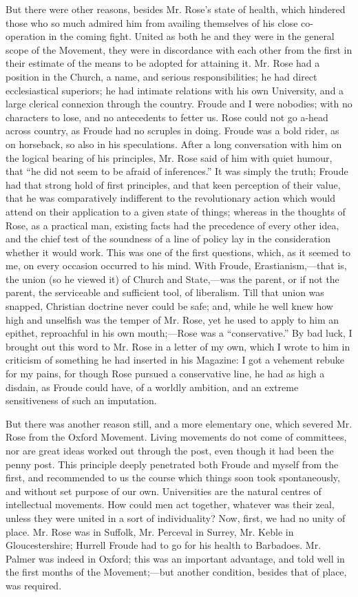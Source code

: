 But there were other reasons, besides Mr. Rose's state of health,
which hindered those who so much admired him from availing themselves of
his close co-operation in the coming fight. United as both he and
they were in the general scope of the Movement, they were in discordance
with each other from the first in their estimate of the means to be
adopted for attaining it. Mr. Rose had a position in the Church, a name,
and serious responsibilities; he had direct ecclesiastical superiors; he
had intimate relations with his own University, and a large clerical
connexion through the country. Froude and I were nobodies; with no
characters to lose, and no antecedents to fetter us. Rose could not go
a-head across country, as Froude had no scruples in doing. Froude was a
bold rider, as on horseback, so also in his speculations. After a long
conversation with him on the logical bearing of his principles, Mr. Rose
said of him with quiet humour, that ``he did not seem to be afraid
of inferences.'' It was simply the truth; Froude had that strong
hold of first principles, and that keen perception of their value, that
he was comparatively indifferent to the revolutionary action which would
attend on their application to a given state of things; whereas in the
thoughts of Rose, as a practical man, existing facts had the precedence
of every other idea, and the chief test of the soundness of a line of
policy lay in the consideration whether it would work. This was one of
the first questions, which, as it seemed to me, on every occasion occurred
to his mind. With Froude, Erastianism,—that is, the union (so he
viewed it) of Church and State,—was the parent, or if not the parent,
the serviceable and sufficient tool, of liberalism. Till that union was
snapped, Christian doctrine never could be safe; and, while he well knew
how high and unselfish was the temper of Mr. Rose, yet he used to apply
to him an epithet, reproachful in his own mouth;—Rose was a
``conservative.'' By bad luck, I brought out this word to Mr.
Rose in a letter of my own, which I wrote to him in criticism of
something he had inserted in his Magazine: I got a vehement
rebuke for my pains, for though Rose pursued a conservative line, he had
as high a disdain, as Froude could have, of a worldly ambition, and an
extreme sensitiveness of such an imputation.

But there was another reason still, and a more elementary one,
which severed Mr. Rose from the Oxford Movement. Living movements do not
come of committees, nor are great ideas worked out through the post,
even though it had been the penny post. This principle deeply penetrated
both Froude and myself from the first, and recommended to us the course
which things soon took spontaneously, and without set purpose of our
own. Universities are the natural centres of intellectual movements. How
could men act together, whatever was their zeal, unless they were united
in a sort of individuality? Now, first, we had no unity of place. Mr.
Rose was in Suffolk, Mr. Perceval in Surrey, Mr. Keble in
Gloucestershire; Hurrell Froude had to go for his health to Barbadoes.
Mr. Palmer was indeed in Oxford; this was an important
advantage, and told well in the first months of the Movement;—but
another condition, besides that of place, was required.

